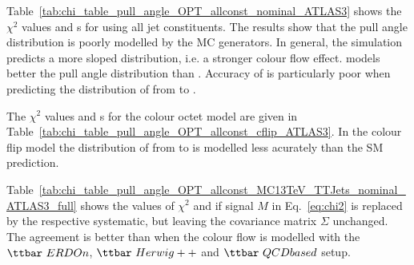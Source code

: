 Table~\ref{tab:chi_table_pull_angle_OPT_allconst_nominal_ATLAS3} shows the $\chi^{2}$ values and \pval s for \pullangle using all jet constituents. The results show that the pull angle distribution is poorly modelled by the MC generators. In general, the simulation predicts a more sloped distribution, i.e. a stronger colour flow effect. \HERWIGpp models better the pull angle distribution than . Accuracy of  is particularly poor when predicting the distribution of \pullangle from \scndleadingjet to \leadingjet.

The $\chi^{2}$ values and \pval s for the \PW colour octet model are given in Table~\ref{tab:chi_table_pull_angle_OPT_allconst_cflip_ATLAS3}. In the colour flip model the distribution of \pullangle from \leadingjet to \scndleadingjet is modelled less acurately than the SM prediction.
  
Table~\ref{tab:chi_table_pull_angle_OPT_allconst_MC13TeV_TTJets_nominal_ATLAS3_full} shows the values of $\chi^{2}$ and if signal $M$ in Eq.~\ref{eq:chi2} is replaced by the respective systematic, but leaving the covariance matrix $\Sigma$ unchanged. The agreement is better than \ttbar when the colour flow is modelled with the $\ttbar\ ERDOn$, $\ttbar\ Herwig++$ and $\ttbar\ QCDbased$ setup.




















